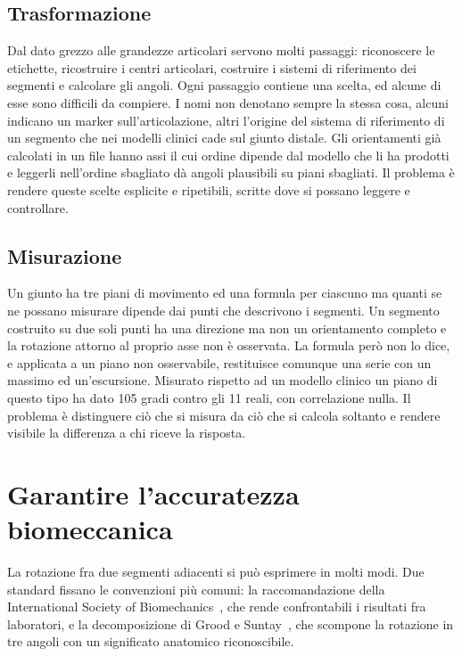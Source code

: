 \subsection{Trasformazione}
\label{subsec:ch2:trasformazione}

Dal dato grezzo alle grandezze articolari servono molti passaggi: riconoscere le
etichette, ricostruire i centri articolari, costruire i sistemi di riferimento
dei segmenti e calcolare gli angoli. Ogni passaggio contiene una scelta, ed alcune di esse
sono difficili da compiere. I nomi non denotano sempre la stessa cosa, alcuni indicano un
marker sull'articolazione, altri l'origine del sistema di riferimento di un
segmento che nei modelli clinici cade sul giunto distale. Gli orientamenti già
calcolati in un file hanno assi il cui ordine dipende dal modello che li ha
prodotti e leggerli nell'ordine sbagliato dà angoli plausibili su piani
sbagliati. Il problema è rendere queste scelte esplicite e ripetibili, scritte 
dove si possano leggere e controllare.

\subsection{Misurazione}
\label{subsec:ch2:misurazione}

Un giunto ha tre piani di movimento ed una formula per ciascuno ma quanti se ne
possano misurare dipende dai punti che descrivono i segmenti. Un segmento
costruito su due soli punti ha una direzione ma non un orientamento completo e la
rotazione attorno al proprio asse non è osservata. La formula però non lo dice, e
applicata a un piano non osservabile, restituisce comunque una serie con un
massimo ed un'escursione. Misurato rispetto ad un modello clinico un piano di questo
tipo ha dato 105 gradi contro gli 11 reali, con correlazione nulla. Il problema è
distinguere ciò che si misura da ciò che si calcola soltanto e rendere visibile
la differenza a chi riceve la risposta.

\section{Garantire l'accuratezza biomeccanica}
\label{sec:ch2:accuratezza}

La rotazione fra due segmenti adiacenti si può esprimere in molti modi.
 Due standard fissano le convenzioni più comuni: la
raccomandazione della International Society of Biomechanics~\cite{wu2002isb},
che rende confrontabili i risultati fra laboratori, e la decomposizione di Grood
e Suntay~\cite{groodsuntay1983}, che scompone la rotazione in tre angoli con un
significato anatomico riconoscibile.

